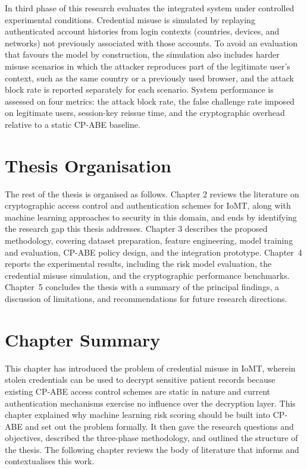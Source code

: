 In third phase of this research evaluates the integrated system under controlled experimental conditions. Credential misuse is simulated by replaying authenticated account histories from login contexts (countries, devices, and networks) not previously associated with those accounts. To avoid an evaluation that favours the model by construction, the simulation also includes harder misuse scenarios in which the attacker reproduces part of the legitimate user's context, such as the same country or a previously used browser, and the attack block rate is reported separately for each scenario. System performance is assessed on four metrics: the attack block rate, the false challenge rate imposed on legitimate users, session-key reissue time, and the cryptographic overhead relative to a static CP-ABE baseline.

\section{Thesis Organisation}
\label{sec:section_ThesisOrg}

The rest of the thesis is organised as follows. Chapter 2 reviews the literature on cryptographic access control and authentication schemes for IoMT, along with machine learning approaches to security in this domain, and ends by identifying the research gap this thesis addresses. Chapter 3 describes the proposed methodology, covering dataset preparation, feature engineering, model training and evaluation, CP-ABE policy design, and the integration prototype. Chapter~4 reports the experimental results, including the risk model evaluation, the credential misuse simulation, and the cryptographic performance benchmarks. Chapter~5 concludes the thesis with a summary of the principal findings, a discussion of limitations, and recommendations for future research directions.

\section{Chapter Summary}
\label{sec:section_Sum}

This chapter has introduced the problem of credential misuse in IoMT, wherein stolen credentials can be used to decrypt sensitive patient records because existing CP-ABE access control schemes are static in nature and current authentication mechanisms exercise no influence over the decryption layer. This chapter explained why machine learning risk scoring should be built into CP-ABE and set out the problem formally. It then gave the research questions and objectives, described the three-phase methodology, and outlined the structure of the thesis. The following chapter reviews the body of literature that informs and contextualises this work.
